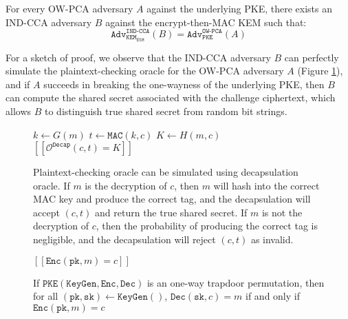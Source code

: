 \documentclass[runningheads]{llncs}
\newcommand{\pke}{\texttt{PKE}}
\newcommand{\keygen}{\texttt{KeyGen}}
\newcommand{\encrypt}{\texttt{Enc}}
\newcommand{\decrypt}{\texttt{Dec}}
\newcommand{\kem}{\texttt{KEM}}
\newcommand{\decap}{\texttt{Decap}}
\newcommand{\etm}{\texttt{EtM}}  %
\newcommand{\mac}{\texttt{MAC}}
\newcommand{\pk}{\texttt{pk}}
\newcommand{\sk}{\texttt{sk}}
\newcommand{\pco}{\texttt{PCO}}
\newcommand{\llbrack}{[\![}
\newcommand{\rrbrack}{]\!]}
\newcommand{\adv}{\texttt{Adv}}
\begin{document}
\begin{lemma}\label{lemma:ind-cca-implies-ow-pca}
    For every OW-PCA adversary $A$ against the underlying PKE, there exists an IND-CCA adversary $B$ against the encrypt-then-MAC KEM such that:
    \begin{equation*}
        \adv^\texttt{IND-CCA}_{\kem_\etm}(B) = \adv^\texttt{OW-PCA}_{\pke}(A)
    \end{equation*}
\end{lemma}

For a sketch of proof, we observe that the IND-CCA adversary $B$ can perfectly simulate the plaintext-checking oracle for the OW-PCA adversary $A$ (Figure \ref{fig:simulate-pca-oracle-with-cca-oracle}), and if $A$ succeeds in breaking the one-wayness of the underlying PKE, then $B$ can compute the shared secret associated with the challenge ciphertext, which allows $B$ to distinguish true shared secret from random bit strings.

\begin{figure}[h]
    \centering
    \begin{minipage}[t]{0.4\textwidth}
        \begin{algorithm}[H]
            \caption*{$\mathcal{O}^\pco_\decap(m, c)$}
            \begin{algorithmic}[1]
                \State $k \leftarrow G(m)$
                \State $t \leftarrow \mac(k, c)$
                \State $K \leftarrow H(m, c)$
                \State \Return $\llbrack \mathcal{O}^\decap(c, t) = K\rrbrack$
            \end{algorithmic}
        \end{algorithm}
    \end{minipage}
    \caption{Plaintext-checking oracle can be simulated using decapsulation oracle. If $m$ is the decryption of $c$, then $m$ will hash into the correct MAC key and produce the correct tag, and the decapsulation will accept $(c, t)$ and return the true shared secret. If $m$ is not the decryption of $c$, then the probability of producing the correct tag is negligible, and the decapsulation will reject $(c, t)$ as invalid.}\label{fig:simulate-pca-oracle-with-cca-oracle}
\end{figure}


\begin{figure}[h]
    \centering

    \begin{minipage}[t]{0.5\textwidth}
    \begin{algorithm}[H]
        \caption*{$\mathcal{O}^\pco(m, c)$}
        \begin{algorithmic}[1]
            \State \Return $\llbrack \encrypt(\pk, m) = c \rrbrack$
        \end{algorithmic}
    \end{algorithm}
    \end{minipage}

    \caption{If $\pke(\keygen, \encrypt, \decrypt)$ is an one-way trapdoor permutation, then for all $(\pk, \sk) \leftarrow \keygen()$, $\decrypt(\sk, c) = m$ if and only if $\encrypt(\pk, m) = c$}\label{fig:pco-trapdoor-perm}
\end{figure}
\end{document}
